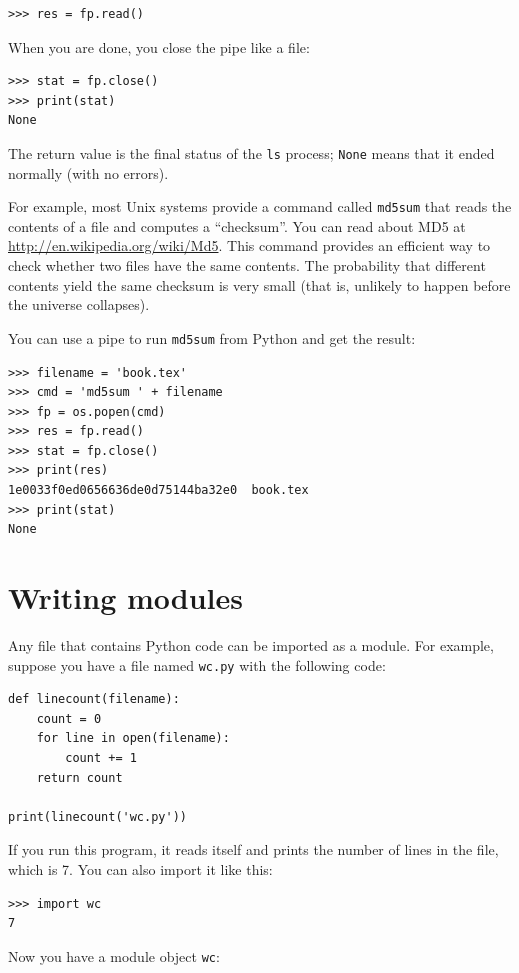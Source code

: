 \documentclass[10pt]{book}
\begin{document}
\begin{verbatim}
>>> res = fp.read()
\end{verbatim}
%
When you are done, you close the pipe like a file:

\begin{verbatim}
>>> stat = fp.close()
>>> print(stat)
None
\end{verbatim}
%
The return value is the final status of the {\tt ls} process;
{\tt None} means that it ended normally (with no errors).

For example, most Unix systems provide a command called {\tt md5sum}
that reads the contents of a file and computes a ``checksum''.
You can read about MD5 at \url{http://en.wikipedia.org/wiki/Md5}.  This
command provides an efficient way to check whether two files
have the same contents.  The probability that different contents
yield the same checksum is very small (that is, unlikely to happen
before the universe collapses).

You can use a pipe to run {\tt md5sum} from Python and get the result:

\begin{verbatim}
>>> filename = 'book.tex'
>>> cmd = 'md5sum ' + filename
>>> fp = os.popen(cmd)
>>> res = fp.read()
>>> stat = fp.close()
>>> print(res)
1e0033f0ed0656636de0d75144ba32e0  book.tex
>>> print(stat)
None
\end{verbatim}



\section{Writing modules}
\label{modules}

Any file that contains Python code can be imported as a module.
For example, suppose you have a file named {\tt wc.py} with the following
code:

\begin{verbatim}
def linecount(filename):
    count = 0
    for line in open(filename):
        count += 1
    return count

print(linecount('wc.py'))
\end{verbatim}
%
If you run this program, it reads itself and prints the number
of lines in the file, which is 7.
You can also import it like this:

\begin{verbatim}
>>> import wc
7
\end{verbatim}
%
Now you have a module object {\tt wc}:
\end{document}
